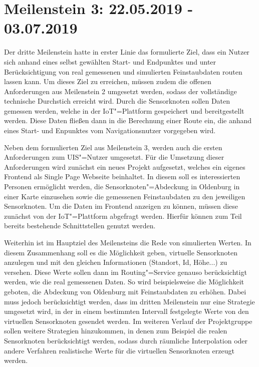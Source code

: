 \section{Meilenstein 3: 22.05.2019 - 03.07.2019}
Der dritte Meilenstein hatte in erster Linie das formulierte Ziel, dass ein Nutzer sich anhand eines selbst gewählten Start- und Endpunktes und unter Berücksichtigung von real gemessenen und simulierten Feinstaubdaten routen lassen kann.
Um dieses Ziel zu erreichen, müssen zudem die offenen Anforderungen aus Meilenstein 2 umgesetzt werden, sodass der vollständige technische Durchstich erreicht wird.
Durch die Sensorknoten sollen Daten gemessen werden, welche in der IoT"=Plattform gespeichert und bereitgestellt werden.
Diese Daten fließen dann in die Berechnung einer Route ein, die anhand eines Start- und Enpunktes vom Navigationsnutzer vorgegeben wird.


Neben dem formulierten Ziel aus Meilenstein 3, werden auch die ersten Anforderungen zum UIS"=Nutzer umgesetzt.
Für die Umsetzung dieser Anforderungen wird zunächst ein neues Projekt aufgesetzt, welches ein eigenes Frontend als Single Page Webseite beinhaltet.
In diesem soll es interessierten Personen ermöglicht werden, die Sensorknoten"=Abdeckung in Oldenburg in einer Karte einzusehen sowie die gemessenen Feinstaubdaten  zu den jeweiligen Sensorknoten.
Um die Daten im Frontend anzeigen zu können, müssen diese zunächst von der IoT"=Plattform abgefragt werden.
Hierfür können zum Teil bereits bestehende Schnittstellen genutzt werden.


Weiterhin ist im Hauptziel des Meilensteins die Rede von simulierten Werten.
In diesem Zusammenhang soll es die Möglichkeit geben, virtuelle Sensorknoten anzulegen und mit den gleichen Informationen (Standort, Id, Höhe...) zu versehen.
Diese Werte sollen dann im Routing"=Service genauso berücksichtigt werden, wie die real gemessenen Daten.
So wird beispielsweise die Möglichkeit geboten, die Abdeckung von Oldenburg mit Feinstaubdaten zu erhöhen.
Dabei muss jedoch berücksichtigt werden, dass im dritten Meilenstein nur eine Strategie umgesetzt wird, in der in einem bestimmten Intervall festgelegte Werte von den virtuellen Sensorknoten gesendet werden.
Im weiteren Verlauf der Projektgruppe sollen weitere Strategien hinzukommen, in denen zum Beispiel die realen Sensorknoten berücksichtigt werden, sodass durch räumliche Interpolation oder andere Verfahren realistische Werte für die virtuellen Sensorknoten erzeugt werden.

